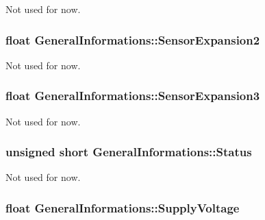 Not used for now. 

\subsubsection[{\texorpdfstring{Sensor\+Expansion2}{SensorExpansion2}}]{\setlength{\rightskip}{0pt plus 5cm}float General\+Informations\+::\+Sensor\+Expansion2}\hypertarget{struct_general_informations_af24f37b896bc32e2adeeffa8826036cd}{}\label{struct_general_informations_af24f37b896bc32e2adeeffa8826036cd}


Not used for now. 

\subsubsection[{\texorpdfstring{Sensor\+Expansion3}{SensorExpansion3}}]{\setlength{\rightskip}{0pt plus 5cm}float General\+Informations\+::\+Sensor\+Expansion3}\hypertarget{struct_general_informations_ac3d8b0c6a9857e27d3420e693c993565}{}\label{struct_general_informations_ac3d8b0c6a9857e27d3420e693c993565}


Not used for now. 

\subsubsection[{\texorpdfstring{Status}{Status}}]{\setlength{\rightskip}{0pt plus 5cm}unsigned short General\+Informations\+::\+Status}\hypertarget{struct_general_informations_ada03b782731dc711fc78f2ab00fe3fcd}{}\label{struct_general_informations_ada03b782731dc711fc78f2ab00fe3fcd}


Not used for now. 

\subsubsection[{\texorpdfstring{Supply\+Voltage}{SupplyVoltage}}]{\setlength{\rightskip}{0pt plus 5cm}float General\+Informations\+::\+Supply\+Voltage}\hypertarget{struct_general_informations_a447fdb3bf03c52d0e173302fcdf27f07}{}\label{struct_general_informations_a447fdb3bf03c52d0e173302fcdf27f07}


